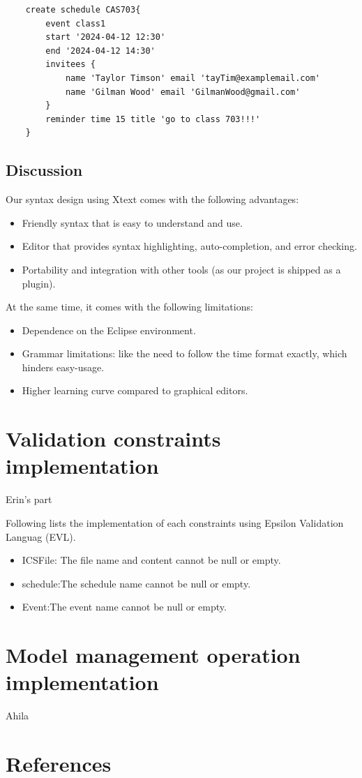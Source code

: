 \documentclass[12pt, letterpaper, twoside]{article}
\begin{document}
\begin{verbatim}
    create schedule CAS703{
        event class1 
        start '2024-04-12 12:30'
        end '2024-04-12 14:30'
        invitees {
            name 'Taylor Timson' email 'tayTim@examplemail.com'
            name 'Gilman Wood' email 'GilmanWood@gmail.com'
        }
        reminder time 15 title 'go to class 703!!!'
    }
\end{verbatim}

\subsection{Discussion}
Our syntax design using Xtext comes with the following advantages:
\begin{itemize}
    \item Friendly syntax that is easy to understand and use.
    \item Editor that provides syntax highlighting, auto-completion, and error checking.
    \item Portability and integration with other tools (as our project is shipped as a plugin). 
\end{itemize}
At the same time, it comes with the following limitations:
\begin{itemize}
    \item Dependence on the Eclipse environment.
    \item Grammar limitations: like the need to follow the time format exactly, which hinders easy-usage.
    \item Higher learning curve compared to graphical editors.
\end{itemize}


\newpage
\section{Validation constraints implementation}
Erin's part

Following lists the implementation of each constraints using Epsilon Validation Languag (EVL).
\begin{itemize}
    \item ICSFile: The file name and content cannot be null or empty.    
    \item schedule:The schedule name cannot be null or empty.
    \item Event:The event name cannot be null or empty. 
\end{itemize}

\newpage
\section{Model management operation implementation}
Ahila



% 
% 

\section{References}
\end{document}
